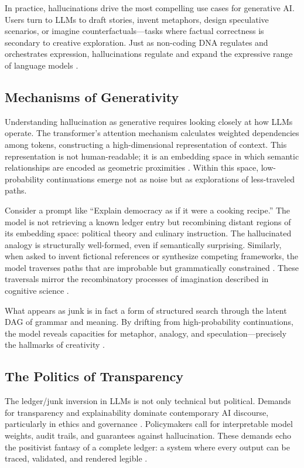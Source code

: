 \documentclass[11pt]{article}
\begin{document}
In practice, hallucinations drive the most compelling use cases for generative AI. Users turn to LLMs to draft stories, invent metaphors, design speculative scenarios, or imagine counterfactuals---tasks where factual correctness is secondary to creative exploration. Just as non-coding DNA regulates and orchestrates expression, hallucinations regulate and expand the expressive range of language models \citep{barad2007}.

\subsection{Mechanisms of Generativity}
Understanding hallucination as generative requires looking closely at how LLMs operate. The transformer’s attention mechanism calculates weighted dependencies among tokens, constructing a high-dimensional representation of context. This representation is not human-readable; it is an embedding space in which semantic relationships are encoded as geometric proximities \citep{vaswani2017}. Within this space, low-probability continuations emerge not as noise but as explorations of less-traveled paths.

Consider a prompt like ``Explain democracy as if it were a cooking recipe.'' The model is not retrieving a known ledger entry but recombining distant regions of its embedding space: political theory and culinary instruction. The hallucinated analogy is structurally well-formed, even if semantically surprising. Similarly, when asked to invent fictional references or synthesize competing frameworks, the model traverses paths that are improbable but grammatically constrained \citep{shanahan2023}. These traversals mirror the recombinatory processes of imagination described in cognitive science \citep{hofstadter1995}.

What appears as junk is in fact a form of structured search through the latent DAG of grammar and meaning. By drifting from high-probability continuations, the model reveals capacities for metaphor, analogy, and speculation---precisely the hallmarks of creativity \citep{bowker2005}.

\subsection{The Politics of Transparency}
The ledger/junk inversion in LLMs is not only technical but political. Demands for transparency and explainability dominate contemporary AI discourse, particularly in ethics and governance \citep{burrell2016}. Policymakers call for interpretable model weights, audit trails, and guarantees against hallucination. These demands echo the positivist fantasy of a complete ledger: a system where every output can be traced, validated, and rendered legible \citep{scott1998}.
\end{document}

